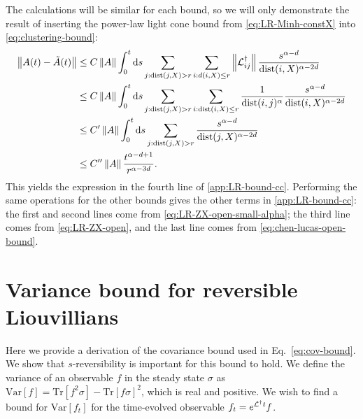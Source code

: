 The calculations will be similar for each bound, so we will only demonstrate the result of inserting the power-law light cone bound from \cref{eq:LR-Minh-constX} into \cref{eq:clustering-bound}:
\begin{align}
  \left\|A(t)-\tilde A(t)\right\| & \le C\left\|A\right\|\int_0^t\text{d}s \sum_{j:\text{dist}(j,X)>r} \sum_{i:d(i,X)\le r} \left\|\mathcal{L}^\dagger_{ij}\right\| \frac{s^{\alpha-d}}{\text{dist}(i,X)^{\alpha-2d}} \\
  & \le C\left\|A\right\|\int_0^t\text{d}s \sum_{j:\text{dist}(j,X)>r} \sum_{i:\text{dist}(i,X)\le r} \frac{1}{\text{dist}(i,j)^{\alpha}} \frac{s^{\alpha-d}}{\text{dist}(i,X)^{\alpha-2d}} \\
  &\le C'\left\|A\right\|\int_0^t\text{d}s \sum_{j:\text{dist}(j,X)>r} \frac{s^{\alpha-d}}{\text{dist}(j,X)^{\alpha-2d}} \\
  &\le C''\left\|A\right\|\frac{t^{\alpha-d+1}}{r^{\alpha-3d}}.
\end{align}
This yields the expression in the fourth line of \cref{app:LR-bound-cc}.
Performing the same operations for the other bounds gives the other terms in \cref{app:LR-bound-cc}: the first and second lines come from \cref{eq:LR-ZX-open-small-alpha}; the third line comes from \cref{eq:LR-ZX-open}, and the last line comes from \cref{eq:chen-lucas-open-bound}.


\section{Variance  bound for reversible Liouvillians} \label{sec:var-bound}

Here we provide a derivation of the covariance bound used in Eq.~\eqref{eq:cov-bound}.  We show that $s$-reversibility is important for this bound to hold. We define the variance of an observable $f$  in the steady state $\sigma$ as $\text{Var}[f] = \text{Tr}[f^2 \sigma] - \text{Tr}[f \sigma]^2$, which is real and positive. We wish to find a bound for $\text{Var}[f_t]$ for the time-evolved observable $f_t = e^{\mathcal{L}^\dagger t} f$.



